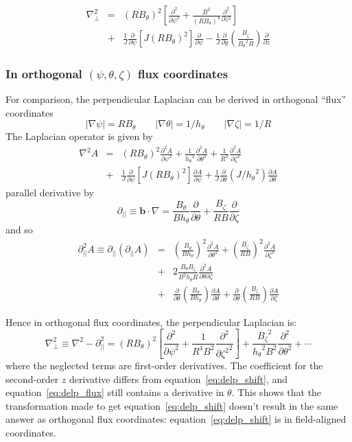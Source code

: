 \documentclass[12pt]{article}
\newcommand{\deriv}[2]{\ensuremath{\frac{\partial #1}{\partial #2}}}
\newcommand{\dderiv}[2]{\ensuremath{\frac{\partial^2 #1}{\partial {#2}^2}}}
\newcommand{\hthe}{\ensuremath{h_\theta}}
\newcommand{\Bp}{\ensuremath{B_\theta}}
\newcommand{\Bt}{\ensuremath{B_\zeta}}
\newcommand{\Vec}[1]{\ensuremath{\mathbf{#1}}}
\newcommand{\bvec}{\Vec{b}}
\newcommand{\delp}{\nabla_\perp^2}
\newcommand{\rbp}{\ensuremath{R\Bp}}
\newcommand{\rbpsq}{\ensuremath{\left(\rbp\right)^2}}
\begin{document}
\begin{eqnarray}
\delp &=& \rbpsq\left[\dderiv{}{\psi} + \frac{B^2}{\left(\rbp\right)^4}\dderiv{}{z}\right] \nonumber \\
&+& \frac{1}{J}\deriv{}{\psi}\left[J\rbpsq\right]\deriv{}{\psi} - \frac{1}{J}\deriv{}{y}\left(\frac{\Bt}{\Bp^2R}\right)\deriv{}{z}
\label{eq:delp_shift}
\end{eqnarray}


\subsubsection{In orthogonal $\left(\psi, \theta, \zeta\right)$ flux coordinates}
For comparison, the perpendicular Laplacian can be derived in orthogonal ``flux'' coordinates
\[
\left|\nabla\psi\right| = \rbp \qquad \left|\nabla\theta\right| = 1/\hthe \qquad \left|\nabla\zeta\right| = 1/R
\]
The Laplacian operator is given by
\begin{eqnarray}
\nabla^2 A &=& \rbpsq\dderiv{A}{\psi} + \frac{1}{\hthe^2}\dderiv{A}{\theta} + \frac{1}{R^2}\dderiv{A}{\zeta} \nonumber \\
&+& \frac{1}{J}\deriv{}{\psi}\left[J\rbpsq\right]\deriv{A}{\psi} + \frac{1}{J}\deriv{}{\theta}\left(J/\hthe^2\right)\deriv{A}{\theta} 
\end{eqnarray}
parallel derivative by
\begin{equation}
\partial_{||} \equiv \bvec\cdot\nabla = \frac{\Bp}{B\hthe}\deriv{}{\theta} + \frac{\Bt}{RB}\deriv{}{\zeta}
\end{equation}
and so
\begin{eqnarray}
\partial^2_{||}A \equiv \partial_{||}\left(\partial_{||}A\right) &=& \left(\frac{\Bp}{B\hthe}\right)^2\dderiv{A}{\theta} + \left(\frac{\Bt}{RB}\right)^2\dderiv{A}{\zeta} \nonumber \\
&+& 2\frac{\Bp\Bt}{B^2\hthe R}\frac{\partial^2 A}{\partial\theta\partial\zeta} \nonumber \\
&+& \deriv{}{\theta}\left(\frac{\Bp}{B\hthe}\right)\deriv{A}{\theta} + \deriv{}{\theta}\left(\frac{\Bt}{RB}\right)\deriv{A}{\zeta}
\end{eqnarray}

Hence in orthogonal flux coordinates, the perpendicular Laplacian is:
\begin{equation}
\delp \equiv \nabla^2 - \partial_{||}^2 = \rbpsq\left[\dderiv{}{\psi} + \frac{1}{R^4B^2}\dderiv{}{\zeta^2}\right] + \frac{\Bt^2}{\hthe^2B^2}\dderiv{}{\theta} + \cdots
\label{eq:delp_flux}
\end{equation} 
where the neglected terms are first-order derivatives. The coefficient for the second-order $z$
derivative differs from equation~\ref{eq:delp_shift}, and equation~\ref{eq:delp_flux} still contains a derivative in $\theta$. This shows that the transformation made to get equation~\ref{eq:delp_shift} doesn't result in the same answer as orthogonal flux coordinates: equation~\ref{eq:delp_shift} is in field-aligned coordinates.
\end{document}
